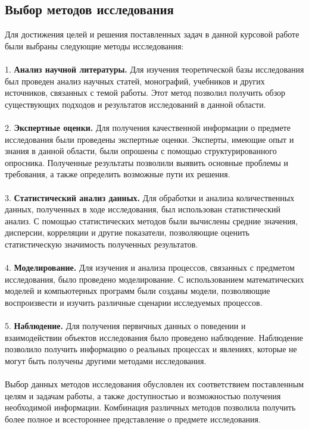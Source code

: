 \documentclass{article}
\begin{document}
\subsection{Выбор методов исследования}
Для достижения целей и решения поставленных задач в данной курсовой работе были выбраны следующие методы исследования:\\
~\\
1. \textbf{Анализ научной литературы.} Для изучения теоретической базы исследования был проведен анализ научных статей, монографий, учебников и других источников, связанных с темой работы. Этот метод позволил получить обзор существующих подходов и результатов исследований в данной области.\\
~\\
2. \textbf{Экспертные оценки.} Для получения качественной информации о предмете исследования были проведены экспертные оценки. Эксперты, имеющие опыт и знания в данной области, были опрошены с помощью структурированного опросника. Полученные результаты позволили выявить основные проблемы и требования, а также определить возможные пути их решения.\\
~\\
3. \textbf{Статистический анализ данных.} Для обработки и анализа количественных данных, полученных в ходе исследования, был использован статистический анализ. С помощью статистических методов были вычислены средние значения, дисперсии, корреляции и другие показатели, позволяющие оценить статистическую значимость полученных результатов.\\
~\\
4. \textbf{Моделирование.} Для изучения и анализа процессов, связанных с предметом исследования, было проведено моделирование. С использованием математических моделей и компьютерных программ были созданы модели, позволяющие воспроизвести и изучить различные сценарии исследуемых процессов.\\
~\\
5. \textbf{Наблюдение.} Для получения первичных данных о поведении и взаимодействии объектов исследования было проведено наблюдение. Наблюдение позволило получить информацию о реальных процессах и явлениях, которые не могут быть получены другими методами исследования.\\
~\\
Выбор данных методов исследования обусловлен их соответствием поставленным целям и задачам работы, а также доступностью и возможностью получения необходимой информации. Комбинация различных методов позволила получить более полное и всестороннее представление о предмете исследования.\\
~\\
\end{document}
